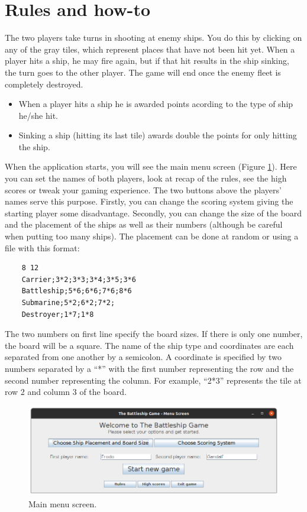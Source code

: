 \documentclass[]{article}
\begin{document}
\section{Rules and how-to}
The two players take turns in shooting at enemy ships. You do this by clicking on any of the gray tiles, which represent places that have not been hit yet. When a player hits a ship, he may fire again, but if that hit results in the ship sinking, the turn goes to the other player. The game will end once the enemy fleet is completely destroyed.
\begin{itemize}
	\item When a player hits a ship he is awarded points acording to the type of ship he/she hit.
	\item Sinking a ship (hitting its last tile) awards double the points for only hitting the ship.
\end{itemize}

When the application starts, you will see the main menu screen (Figure \ref{fig:menuscreenshot}). Here you can set the names of both players, look at recap of the rules, see the high scores or tweak your gaming experience. The two buttons above the players' names serve this purpose. Firstly, you can change the scoring system giving the starting player some disadvantage. Secondly, you can change the size of the board and the placement of the ships as well as their numbers (although be careful when putting too many ships). The placement can be done at random or using a file with this format:

\begin{verbatim}
	8 12
	Carrier;3*2;3*3;3*4;3*5;3*6
	Battleship;5*6;6*6;7*6;8*6
	Submarine;5*2;6*2;7*2;
	Destroyer;1*7;1*8
\end{verbatim}
The two numbers on first line specify the board sizes. If there is only one number, the board will be a square. The name of the ship type and coordinates are each separated from one another by a semicolon. A coordinate is specified by two numbers separated by a “*” with the first number representing the row and the second number representing the column. For example, “2*3” represents the tile at row 2 and column 3 of the board.

\begin{figure}[h]
	\centering
	\includegraphics[width=0.7\linewidth]{figs/menuScreenshot}
	\caption{Main menu screen.}
	\label{fig:menuscreenshot}
\end{figure}
\end{document}
